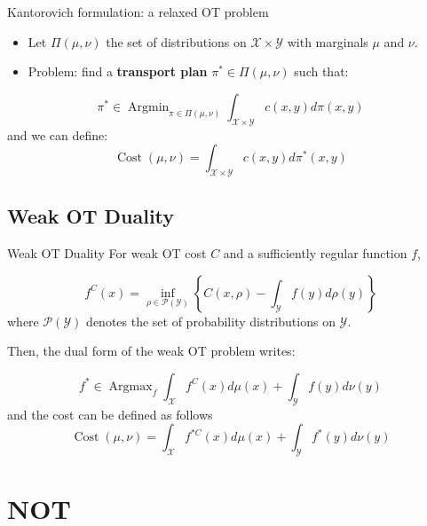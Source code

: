 \documentclass{beamer}
\DeclareMathOperator*{\Argmin}{\text{Argmin}}
\DeclareMathOperator*{\Argmax}{\text{Argmax}}
\DeclareMathOperator*{\Cost}{\text{Cost}}
\begin{document}
\begin{frame}{Kantorovich formulation: a relaxed OT problem}
\begin{itemize}
\item Let $\Pi(\mu,\nu)$ the set of distributions on $\mathcal{X}\times\mathcal{Y}$ with marginals $\mu$ and $\nu$.
\item Problem: find a \textbf{transport plan} $\pi^*\in \Pi(\mu,\nu)$ such that:
\end{itemize}
\begin{equation}
    \pi^* \in \Argmin_{\pi\in\Pi(\mu,\nu)} \int_{\mathcal{X}\times\mathcal{Y}} c(x,y)d\pi(x,y)
\end{equation}
and we can define:
\begin{equation}
    \Cost(\mu,\nu) = \int_{\mathcal{X}\times\mathcal{Y}} c(x,y)d\pi^*(x,y)
\end{equation}
\end{frame}

\subsection{Weak OT Duality}
\begin{frame}{Weak OT Duality}
For weak OT cost $C$ and a sufficiently regular function $f$,

\begin{equation}
    f^C(x) = \inf_{\rho\in \mathcal{P}(\mathcal{Y})} \left\{C(x,\rho)-\int_{\mathcal{Y}}f(y)d\rho(y)\right\}
\end{equation}
where $\mathcal{P}(\mathcal{Y})$ denotes the set of probability distributions on $\mathcal{Y}$.

Then, the dual form of the weak OT problem writes:

\begin{equation}
    f^*\in\Argmax_{f} \int_{\mathcal{X}} f^C(x)d\mu(x) + \int_{\mathcal{Y}} f(y)d\nu(y)
\end{equation}
and the cost can be defined as follows
\begin{equation}
    \Cost(\mu,\nu) = \int_{\mathcal{X}} f^{*C}(x)d\mu(x) + \int_{\mathcal{Y}} f^*(y)d\nu(y)
\end{equation}

\end{frame}

\section{NOT}
\end{document}
